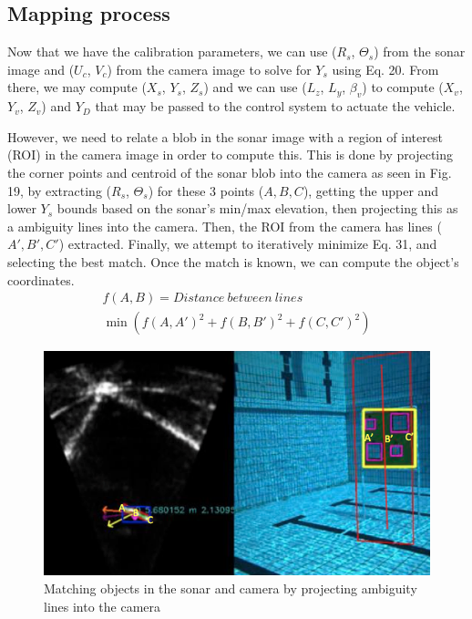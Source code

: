 \documentclass[15pt]{article}
\let\Theta\varTheta
\newcommand{\RSonar}{$\si{\textit{R}_{s}}$\xspace}
\newcommand{\ThetaSonar}{$\si{\Theta_{s}}$\xspace}
\newcommand{\UCamera}{$\si{\textit{U}_{c}}$\xspace}
\newcommand{\VCamera}{$\si{\textit{V}_{c}}$\xspace}
\newcommand{\XSonar}{$\si{\textit{X}_{s}}$\xspace}
\newcommand{\YSonar}{$\si{\textit{Y}_{s}}$\xspace}
\newcommand{\ZSonar}{$\si{\textit{Z}_{s}}$\xspace}
\newcommand{\YDepth}{$Y_{D}$\xspace}
\newcommand{\XVehicle}{$\si{\textit{X}_{v}}$\xspace}
\newcommand{\YVehicle}{$\si{\textit{Y}_{v}}$\xspace}
\newcommand{\ZVehicle}{$\si{\textit{Z}_{v}}$\xspace}
\newcommand{\PitchVehicle}{${\beta_{v}}$\xspace}
\begin{document}
\subsection{Mapping process}

Now that we have the calibration parameters, we can use (\RSonar, \ThetaSonar) from the sonar image and (\UCamera, \VCamera) from the camera image to solve for \YSonar using Eq. 20. From there, we may compute (\XSonar, \YSonar, \ZSonar) and we can use ($L_{z}$, $L_{y}$, \PitchVehicle) to compute (\XVehicle, \YVehicle, \ZVehicle) and \YDepth that may be passed to the control system to actuate the vehicle.

However, we need to relate a blob in the sonar image with a region of interest (ROI) in the camera image in order to compute this. This is done by projecting the corner points and centroid of the sonar blob into the camera as seen in Fig. 19, by extracting (\RSonar, \ThetaSonar) for these 3 points ($A, B, C$), getting the upper and lower \YSonar bounds based on the sonar's min/max elevation, then projecting this as a ambiguity lines into the camera. Then, the ROI from the camera has lines ($A', B', C'$) extracted. Finally, we attempt to iteratively minimize Eq. 31, and selecting the best match. Once the match is known, we can compute the object's coordinates.
\begin{gather}
f(A,B) = Distance\ between\ lines \nonumber\\
\min \left( f\left( A,A' \right)^{2}+f\left( B,B' \right)^{2}+f\left( C,C' \right)^{2} \right)
\end{gather}

\begin{figure}[h!]
  \centering
  \includegraphics[scale=0.4]{project}
  \captionsetup{justification=centering}
  \caption{Matching objects in the sonar and camera by projecting ambiguity lines into the camera}
\end{figure}
\end{document}
